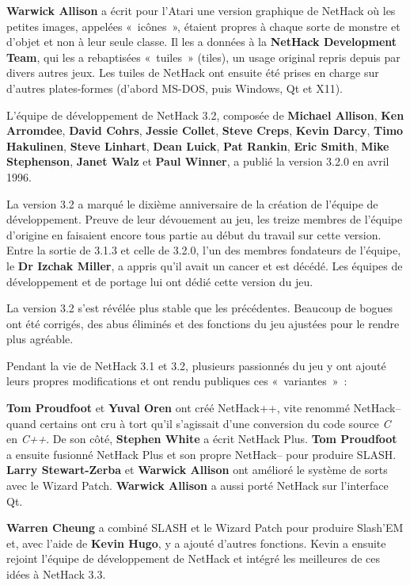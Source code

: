 \documentclass[titlepage]{article}
\begin{document}
\textbf{Warwick Allison} a écrit pour l'Atari une version graphique de
NetHack où les petites images, appelées «~icônes~», étaient propres
à chaque sorte de monstre et d'objet et non à leur seule classe.
Il les a données à la \textbf{NetHack Development Team}, qui les a rebaptisées
«~tuiles~» (tiles), un usage original repris depuis par divers
autres jeux.
Les tuiles de NetHack ont ensuite été prises en charge sur d'autres
plates-formes (d'abord MS-DOS, puis Windows, Qt et X11).


L'équipe de développement de NetHack 3.2, composée de \textbf{Michael
Allison}, \textbf{Ken Arromdee}, \textbf{David Cohrs}, \textbf{Jessie Collet},
\textbf{Steve Creps}, \textbf{Kevin Darcy}, \textbf{Timo Hakulinen}, \textbf{Steve
Linhart}, \textbf{Dean Luick}, \textbf{Pat Rankin}, \textbf{Eric Smith}, \textbf{Mike
Stephenson}, \textbf{Janet Walz} et \textbf{Paul Winner}, a publié la version
3.2.0 en avril 1996.


La version 3.2 a marqué le dixième anniversaire de la création de l'équipe
de développement.
Preuve de leur dévouement au jeu, les treize membres de l'équipe d'origine
en faisaient encore tous partie au début du travail sur cette version.
Entre la sortie de 3.1.3 et celle de 3.2.0, l'un des membres fondateurs de
l'équipe, le \textbf{Dr Izchak Miller}, a appris qu'il avait un cancer et est
décédé.
Les équipes de développement et de portage lui ont dédié cette version du
jeu.


La version 3.2 s'est révélée plus stable que les précédentes.
Beaucoup de bogues ont été corrigés, des abus éliminés et des fonctions du
jeu ajustées pour le rendre plus agréable.


Pendant la vie de NetHack 3.1 et 3.2, plusieurs passionnés du jeu y ont
ajouté leurs propres modifications et ont rendu publiques ces
«~variantes~»~:


\textbf{Tom Proudfoot} et \textbf{Yuval Oren} ont créé NetHack++, vite renommé
NetHack-- quand certains ont cru à tort qu'il s'agissait d'une conversion
du code source \textit{C} en \textit{C++}.
De son côté, \textbf{Stephen White} a écrit NetHack Plus.
\textbf{Tom Proudfoot} a ensuite fusionné NetHack Plus et son propre NetHack--
pour produire SLASH.
\textbf{Larry Stewart-Zerba} et \textbf{Warwick Allison} ont amélioré le système
de sorts avec le Wizard Patch.
\textbf{Warwick Allison} a aussi porté NetHack sur l'interface Qt.


\textbf{Warren Cheung} a combiné SLASH et le Wizard Patch pour produire
Slash'EM et, avec l'aide de \textbf{Kevin Hugo}, y a ajouté d'autres fonctions.
Kevin a ensuite rejoint l'équipe de développement de NetHack et intégré
les meilleures de ces idées à NetHack 3.3.
\end{document}
